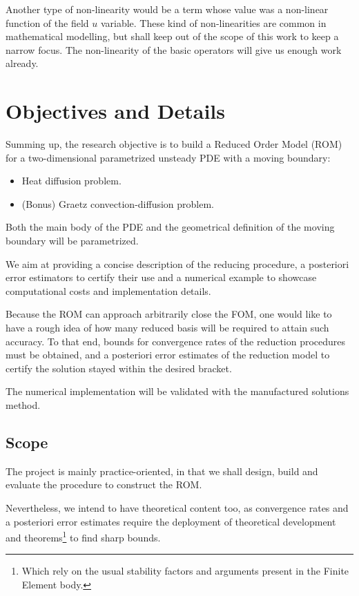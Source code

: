 \documentclass[../main.tex]{subfiles}
\begin{document}
Another type of non-linearity would be a term whose value was a non-linear function of the field $u$ variable. 
These kind of non-linearities are common in mathematical modelling, but shall keep out of the scope of this work to keep a narrow focus. 
The non-linearity of the basic operators will give us enough work already.

\section{Objectives and Details}
Summing up, the research objective is to build a Reduced Order Model (ROM) for a two-dimensional parametrized unsteady PDE with a moving boundary:
\begin{itemize}
   \item Heat diffusion problem.
   \item (Bonus) Graetz convection-diffusion problem.
\end{itemize}
Both the main body of the PDE and the geometrical definition of the moving boundary will be parametrized.

We aim at providing a concise description of the reducing procedure, 
a posteriori error estimators to certify their use and 
a numerical example to showcase computational costs and implementation details.

Because the ROM can approach arbitrarily close the FOM, one would like to have a rough idea of how many reduced basis will be required to attain such accuracy. 
To that end, bounds for convergence rates of the reduction procedures must be obtained, and a posteriori error estimates of the reduction model to certify the solution stayed within the desired bracket. 

The numerical implementation will be validated with the manufactured solutions method.

\subsection{Scope}
The project is mainly practice-oriented, in that we shall design, build and evaluate the procedure to construct the ROM.

Nevertheless, we intend to have theoretical content too, as convergence rates and a posteriori error estimates require the deployment of theoretical development and theorems\footnote{
   Which rely on the usual stability factors and arguments present in the Finite Element body.} 
to find sharp bounds.
\end{document}
